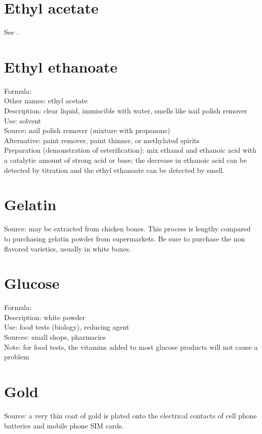 \section{Ethyl acetate}
\label{sec:}
See .

\section{Ethyl ethanoate}
\label{sec:ethylethanoate}
Formula: \\
Other names: ethyl acetate\\
Description: clear liquid, 
immiscible with water, 
smells like nail polish remover\\
Use: solvent\\
Source: nail polish remover (mixture with propanone)\\
Alternative: paint remover, 
paint thinner, 
or methylated spirits\\
Preparation (demonstration of esterification): 
mix ethanol and ethanoic acid 
with a catalytic amount of strong acid or base; 
the decrease in ethanoic acid can be detected 
by titration and the ethyl ethanoate can be detected by smell.

\section{Gelatin}
\label{sec:}
Source: may be extracted from chicken bones. 
This process is lengthy compared 
to purchasing gelatin powder from supermarkets. 
Be sure to purchase the non flavored varieties, 
usually in white boxes.

\section{Glucose}
\label{sec:}
Formula: \\
Description: white powder\\
Use: food tests (biology), 
reducing agent\\
Sources: small shops, 
pharmacies\\
Note: for food tests, 
the vitamins added to most glucose products will not cause a problem

\section{Gold}
\label{sec:}
Source: a very thin coat of gold is plated 
onto the electrical contacts of cell phone batteries 
and mobile phone SIM cards.

